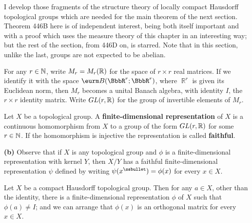 
\def\chaptername{Topological groups}
\def\sectionname{The structure of locally compact groups}

\def\ker{\mathop{\text{ker}}}


I develop those fragments of the structure theory of locally compact
Hausdorff topological groups which are needed for the main theorem of
the next section.   Theorem 446B here is of independent interest, being
both itself important and with a proof which uses the measure theory
of this chapter in an interesting way;  but the rest of the section,
from 446D on, is starred.   Note that in this section, unlike the last,
groups are not expected to be abelian.

For any $r\in\Bbb N$, write $M_r=M_r(\Bbb R)$ for the space of
$r\times r$ real matrices.   If we identify it with the space
$\eurm B(\BbbR^r;\BbbR^r)$, where $\BbbR^r$ is given its Euclidean norm,
then $M_r$ becomes a unital Banach algebra, with
identity $I$, the $r\times r$ identity matrix.   Write $GL(r,\Bbb R)$
for the group of invertible elements of $M_r$.

\medskip

 Let $X$ be a topological group.   A
{\bf finite-dimensional representation} of $X$ is a continuous
homomorphism from $X$ to a group of the form $GL(r,\Bbb R)$ for some
$r\in\Bbb N$.   If the homomorphism is injective the representation is
called {\bf faithful}.

\medskip

{\bf (b)} Observe that if $X$ is any topological group and $\phi$ is a
finite-dimensional representation with kernel $Y$, then $X/Y$ has a
faithful finite-dimensional representation $\psi$ defined by writing
$\psi(x^{\ssbullet})=\phi(x)$ for every $x\in X$.

 Let $X$ be a compact Hausdorff topological group.
Then for any $a\in X$, other than the identity, there is a
finite-dimensional representation $\phi$ of $X$ such that
$\phi(a)\ne I$;  and we can arrange that $\phi(x)$ is an orthogonal matrix
for every $x\in X$.

